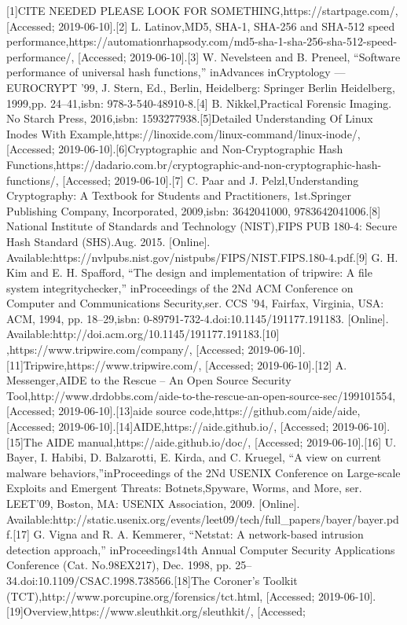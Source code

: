 \documentclass[
	a4paper,					%
	10pt,							%
	twoside,					%
	openright,				%
	notitlepage,			%
	parskip=half,			%
]{scrreprt}					%
\begin{document}

\cleardoublepage
{} 
{}

[1]CITE NEEDED PLEASE LOOK FOR SOMETHING,https://startpage.com/, [Accessed; 2019-06-10].[2] L. Latinov,MD5, SHA-1, SHA-256 and SHA-512 speed performance,https://automationrhapsody.com/md5-sha-1-sha-256-sha-512-speed-performance/, [Accessed; 2019-06-10].[3] W. Nevelsteen and B. Preneel, “Software performance of universal hash functions,” inAdvances inCryptology — EUROCRYPT ’99, J. Stern, Ed., Berlin, Heidelberg: Springer Berlin Heidelberg, 1999,pp. 24–41,isbn: 978-3-540-48910-8.[4] B. Nikkel,Practical Forensic Imaging. No Starch Press, 2016,isbn: 1593277938.[5]Detailed Understanding Of Linux Inodes With Example,https://linoxide.com/linux-command/linux-inode/, [Accessed; 2019-06-10].[6]Cryptographic and Non-Cryptographic Hash Functions,https://dadario.com.br/cryptographic-and-non-cryptographic-hash-functions/, [Accessed; 2019-06-10].[7] C. Paar and J. Pelzl,Understanding Cryptography: A Textbook for Students and Practitioners, 1st.Springer Publishing Company, Incorporated, 2009,isbn: 3642041000, 9783642041006.[8] National Institute of Standards and Technology (NIST),FIPS PUB 180-4: Secure Hash Standard (SHS).Aug. 2015. [Online]. Available:https://nvlpubs.nist.gov/nistpubs/FIPS/NIST.FIPS.180-4.pdf.[9] G. H. Kim and E. H. Spafford, “The design and implementation of tripwire: A file system integritychecker,” inProceedings of the 2Nd ACM Conference on Computer and Communications Security,ser. CCS ’94, Fairfax, Virginia, USA: ACM, 1994, pp. 18–29,isbn: 0-89791-732-4.doi:10.1145/191177.191183. [Online]. Available:http://doi.acm.org/10.1145/191177.191183.[10] ,https://www.tripwire.com/company/, [Accessed; 2019-06-10].[11]Tripwire,https://www.tripwire.com/, [Accessed; 2019-06-10].[12] A. Messenger,AIDE to the Rescue – An Open Source Security Tool,http://www.drdobbs.com/aide-to-the-rescue-an-open-source-sec/199101554, [Accessed; 2019-06-10].[13]aide source code,https://github.com/aide/aide, [Accessed; 2019-06-10].[14]AIDE,https://aide.github.io/, [Accessed; 2019-06-10].[15]The AIDE manual,https://aide.github.io/doc/, [Accessed; 2019-06-10].[16] U. Bayer, I. Habibi, D. Balzarotti, E. Kirda, and C. Kruegel, “A view on current malware behaviors,”inProceedings of the 2Nd USENIX Conference on Large-scale Exploits and Emergent Threats: Botnets,Spyware, Worms, and More, ser. LEET’09, Boston, MA: USENIX Association, 2009. [Online]. Available:http://static.usenix.org/events/leet09/tech/full_papers/bayer/bayer.pdf.[17] G. Vigna and R. A. Kemmerer, “Netstat: A network-based intrusion detection approach,” inProceedings14th Annual Computer Security Applications Conference (Cat. No.98EX217), Dec. 1998, pp. 25–34.doi:10.1109/CSAC.1998.738566.[18]The Coroner’s Toolkit (TCT),http://www.porcupine.org/forensics/tct.html, [Accessed; 2019-06-10].[19]Overview,https://www.sleuthkit.org/sleuthkit/, [Accessed; 
\end{document}
